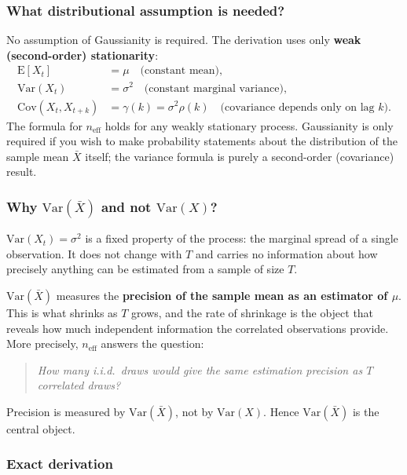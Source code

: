 \documentclass[11pt, a4paper]{article}
\begin{document}
\subsubsection*{What distributional assumption is needed?}

No assumption of Gaussianity is required.
The derivation uses only \textbf{weak (second-order) stationarity}:
\begin{align}
    \mathrm{E}[X_t] &= \mu \quad \text{(constant mean)}, \\
    \mathrm{Var}(X_t) &= \sigma^2 \quad \text{(constant marginal variance)}, \\
    \mathrm{Cov}(X_t, X_{t+k}) &= \gamma(k) = \sigma^2\rho(k)
        \quad \text{(covariance depends only on lag } k\text{)}.
\end{align}
The formula for $n_\mathrm{eff}$ holds for any weakly stationary process.
Gaussianity is only required if you wish to make probability statements about the
distribution of the sample mean $\bar{X}$ itself; the variance formula is
purely a second-order (covariance) result.

\subsubsection*{Why $\mathrm{Var}(\bar{X})$ and not $\mathrm{Var}(X)$?}

$\mathrm{Var}(X_t) = \sigma^2$ is a fixed property of the process:
the marginal spread of a single observation.
It does not change with $T$ and carries no information about how precisely
anything can be estimated from a sample of size $T$.

$\mathrm{Var}(\bar{X})$ measures the \textbf{precision of the sample mean as an
estimator of $\mu$}.
This is what shrinks as $T$ grows, and the rate of shrinkage is the object that
reveals how much independent information the correlated observations provide.
More precisely, $n_\mathrm{eff}$ answers the question:
\begin{quote}
    \textit{How many i.i.d.\ draws would give the same estimation precision
    as $T$ correlated draws?}
\end{quote}
Precision is measured by $\mathrm{Var}(\bar{X})$, not by $\mathrm{Var}(X)$.
Hence $\mathrm{Var}(\bar{X})$ is the central object.

\subsubsection*{Exact derivation}
\end{document}
